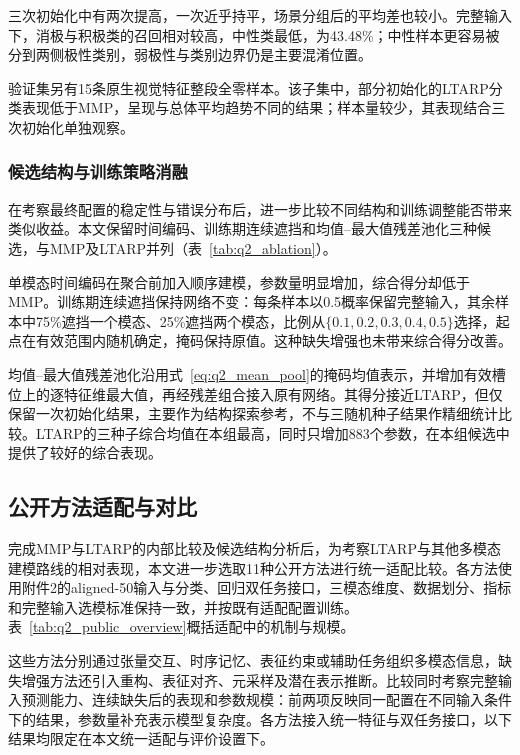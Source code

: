 \QTwoParagraph 三次初始化中有两次提高，一次近乎持平，场景分组后的平均差也较小。完整输入下，消极与积极类的召回相对较高，中性类最低，为43.48\%；中性样本更容易被分到两侧极性类别，弱极性与类别边界仍是主要混淆位置。

\QTwoParagraph 验证集另有15条原生视觉特征整段全零样本。该子集中，部分初始化的LTARP分类表现低于MMP，呈现与总体平均趋势不同的结果；样本量较少，其表现结合三次初始化单独观察。

\subsubsection{候选结构与训练策略消融}
\QTwoParagraph 在考察最终配置的稳定性与错误分布后，进一步比较不同结构和训练调整能否带来类似收益。本文保留时间编码、训练期连续遮挡和均值--最大值残差池化三种候选，与MMP及LTARP并列（表~\ref{tab:q2_ablation}）。



\QTwoParagraph 单模态时间编码在聚合前加入顺序建模，参数量明显增加，综合得分却低于MMP。训练期连续遮挡保持网络不变：每条样本以0.5概率保留完整输入，其余样本中75\%遮挡一个模态、25\%遮挡两个模态，比例从$\{0.1,0.2,0.3,0.4,0.5\}$选择，起点在有效范围内随机确定，掩码保持原值。这种缺失增强也未带来综合得分改善。

\QTwoParagraph 均值--最大值残差池化沿用式~\eqref{eq:q2_mean_pool}的掩码均值表示，并增加有效槽位上的逐特征维最大值，再经残差组合接入原有网络。其得分接近LTARP，但仅保留一次初始化结果，主要作为结构探索参考，不与三随机种子结果作精细统计比较。LTARP的三种子综合均值在本组最高，同时只增加883个参数，在本组候选中提供了较好的综合表现。
\FloatBarrier

\subsection{公开方法适配与对比}\label{subsec:q2_public}
\QTwoParagraph 完成MMP与LTARP的内部比较及候选结构分析后，为考察LTARP与其他多模态建模路线的相对表现，本文进一步选取11种公开方法进行统一适配比较。各方法使用附件2的aligned-50输入与分类、回归双任务接口，三模态维度、数据划分、指标和完整输入选模标准保持一致，并按既有适配配置训练。表~\ref{tab:q2_public_overview}概括适配中的机制与规模。



\QTwoParagraph 这些方法分别通过张量交互、时序记忆、表征约束或辅助任务组织多模态信息，缺失增强方法还引入重构、表征对齐、元采样及潜在表示推断。比较同时考察完整输入预测能力、连续缺失后的表现和参数规模：前两项反映同一配置在不同输入条件下的结果，参数量补充表示模型复杂度。各方法接入统一特征与双任务接口，以下结果均限定在本文统一适配与评价设置下。

